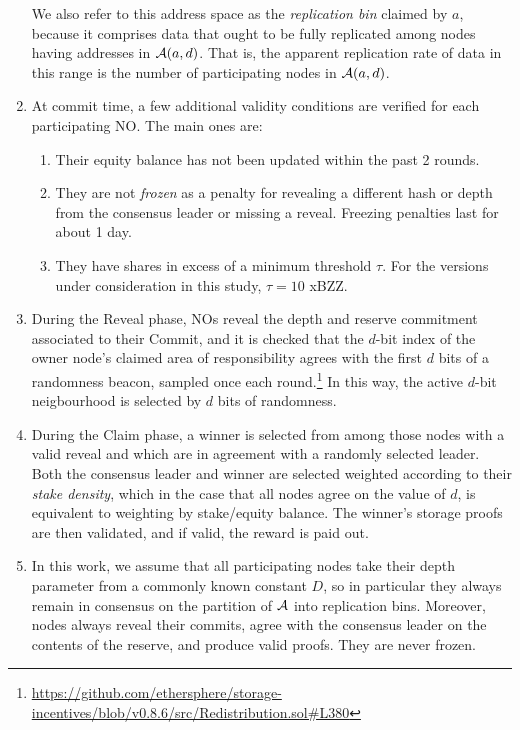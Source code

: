 \begin{enumerate}
    We also refer to this address space as the \emph{replication bin} claimed by $a$, because it comprises data that ought to be fully replicated among nodes having addresses in $\mathcal{A}(a,d)$.
    That is, the apparent replication rate of data in this range is the number of participating nodes in $\mathcal{A}(a,d)$.

    
  \item
    At commit time, a few additional validity conditions are verified for each participating NO.
    The main ones are:
    \begin{enumerate}
      \item Their equity balance has not been updated within the past 2 rounds.
      \item 
        They are not \emph{frozen} as a penalty for revealing a different hash or depth from the consensus leader or missing a reveal. 
        Freezing penalties last for about 1 day.
      \item 
        They have shares in excess of a minimum threshold $\tau$. For the versions under consideration in this study, $\tau=10$ xBZZ.
    \end{enumerate}

  \item
    During the Reveal phase, NOs reveal the depth and reserve commitment associated to their Commit, and it is checked that the $d$-bit index of the owner node's claimed area of responsibility agrees with the first $d$ bits of a randomness beacon, sampled once each round.\footnote{\url{https://github.com/ethersphere/storage-incentives/blob/v0.8.6/src/Redistribution.sol\#L380}}
    In this way, the active $d$-bit neigbourhood is selected by $d$ bits of randomness.

  \item    
    During the Claim phase, a winner is selected from among those nodes with a valid reveal and which are in agreement with a randomly selected leader.
    Both the consensus leader and winner are selected weighted according to their \emph{stake density}, which in the case that all nodes agree on the value of $d$, is equivalent to weighting by stake/equity balance.
    The winner's storage proofs are then validated, and if valid, the reward is paid out.

  \item
    In this work, we assume that all participating nodes take their depth parameter from a commonly known constant $D$, so in particular they always remain in consensus on the partition of $\mathcal{A}$ into replication bins.
    Moreover, nodes always reveal their commits, agree with the consensus leader on the contents of the reserve, and produce valid proofs.
    They are never frozen.


\end{enumerate}

